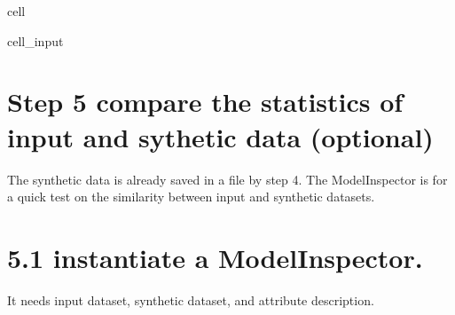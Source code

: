 \documentclass[letterpaper,10pt,english]{jupyterBook}
\begin{document}
\begin{sphinxuseclass}{cell}\begin{sphinxVerbatimInput}

\begin{sphinxuseclass}{cell_input}
\begin{sphinxVerbatim}[commandchars=\\\{\}]
  
 
\end{sphinxVerbatim}

\end{sphinxuseclass}\end{sphinxVerbatimInput}

\end{sphinxuseclass}

\section{Step 5 compare the statistics of input and sythetic data (optional)}
\label{\detokenize{src/test/SynthNAV0:id5}}
\sphinxAtStartPar
The synthetic data is already saved in a file by step 4. The ModelInspector is for a quick test on the similarity between input and synthetic datasets.


\section{5.1 instantiate a ModelInspector.}
\label{\detokenize{src/test/SynthNAV0:id6}}
\sphinxAtStartPar
It needs input dataset, synthetic dataset, and attribute description.
\end{document}
